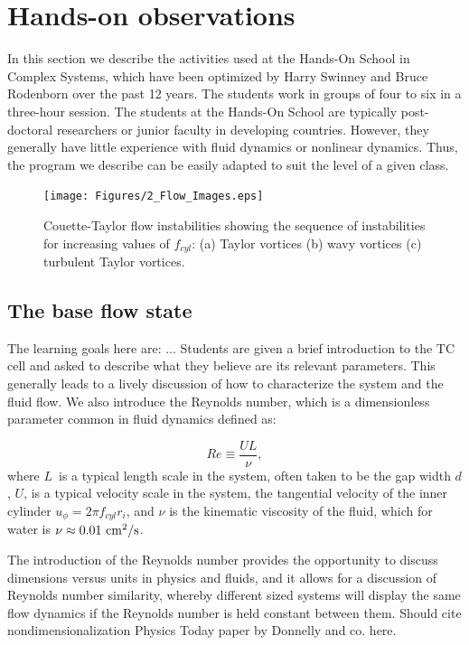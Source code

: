 \documentclass[%
reprint,
 amsmath,amssymb,
 aps,
prb,
floatfix,
longbibliography,
notitlepage
]{revtex4-1}
\newcommand{\BE}{\begin{equation}}
\newcommand{\EE}{\end{equation}}
\newcommand{\DB}[1]{{\color{red}#1}} %
\newcommand{\ReN}{\ensuremath{Re}} %
\newcommand{\vscale}{\ensuremath{U}} %
\newcommand{\lscale}{\ensuremath{L}} %
\newcommand{\visc}{\ensuremath{\nu}} %
\newcommand{\gap}{\ensuremath{d}} %
\newcommand{\rad}[1]{\ensuremath{r_{#1}}} %
\newcommand{\vel}{\ensuremath{u}}
\begin{document}
\section{Hands-on observations}
In this section we describe the activities used at the Hands-On School in Complex Systems, which have been optimized by Harry Swinney and Bruce Rodenborn over the past 12 years. The students work in groups of four to six in a three-hour session. The students at the Hands-On School are typically post-doctoral researchers or junior faculty in developing countries. However, they generally have little experience with fluid dynamics or nonlinear dynamics. Thus, the program we describe can be easily adapted to suit the level of a given class.

\begin{figure}[ht]
  \centering
    \texttt{[image: Figures/2\_Flow\_Images.eps]}
    \caption{Couette-Taylor flow instabilities showing the sequence of instabilities for increasing values of $f_{cyl}$: (a) Taylor vortices (b) wavy vortices (c) turbulent Taylor vortices.}\label{fig:flow_patterns}
\end{figure}

\subsection{The base flow state}
The learning goals here are: ...
Students are given a brief introduction to the TC cell and asked to describe what they believe are its relevant parameters. This generally leads to a lively discussion of how to characterize the system and the fluid flow. We also introduce the Reynolds number, which is a dimensionless parameter common in fluid dynamics defined as:

\BE
\ReN\equiv \frac{\vscale\lscale}{\visc},
\EE
where \lscale\ is a typical length scale in the system, often taken to be the gap width \gap, \vscale, is a typical velocity scale in the system, the tangential velocity of the inner cylinder $\vel_\phi=2\pi f_{cyl}\rad{i}$, and $\nu$ is the kinematic viscosity of the fluid, which for water is $\visc\approx 0.01~\rm cm^2/ s$.\cite{fluids_general}

The introduction of the Reynolds number provides the opportunity to discuss dimensions versus units in physics and fluids, and it allows for a discussion of Reynolds number similarity, whereby different sized systems will display the same flow dynamics if the Reynolds number is held constant between them.\cite{fluids_general} \DB{Should cite nondimensionalization Physics Today paper by Donnelly and co. here.}
\end{document}
